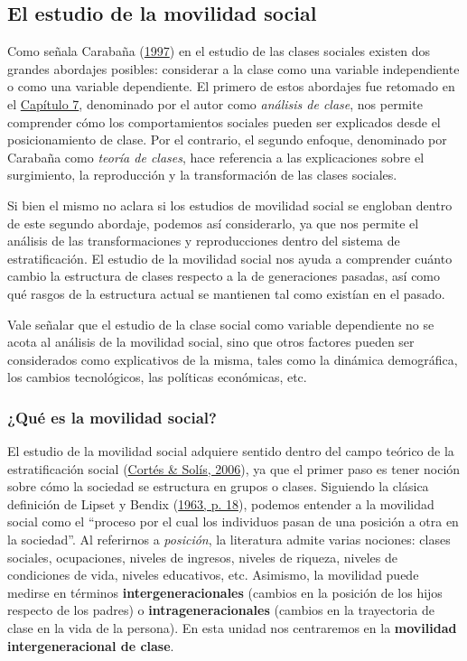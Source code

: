 \documentclass[
]{article}
\begin{document}
\hypertarget{movilidad1}{%
\subsection{El estudio de la movilidad social}\label{movilidad1}}

Como señala Carabaña (\protect\hyperlink{ref-Carabana1997}{1997}) en el estudio de las clases sociales existen dos grandes abordajes posibles: considerar a la clase como una variable independiente o como una variable dependiente. El primero de estos abordajes fue retomado en el \protect\hyperlink{independiente}{Capítulo 7}, denominado por el autor como \emph{análisis de clase}, nos permite comprender cómo los comportamientos sociales pueden ser explicados desde el posicionamiento de clase. Por el contrario, el segundo enfoque, denominado por Carabaña como \emph{teoría de clases}, hace referencia a las explicaciones sobre el surgimiento, la reproducción y la transformación de las clases sociales.

Si bien el mismo no aclara si los estudios de movilidad social se engloban dentro de este segundo abordaje, podemos así considerarlo, ya que nos permite el análisis de las transformaciones y reproducciones dentro del sistema de estratificación. El estudio de la movilidad social nos ayuda a comprender cuánto cambio la estructura de clases respecto a la de generaciones pasadas, así como qué rasgos de la estructura actual se mantienen tal como existían en el pasado.

Vale señalar que el estudio de la clase social como variable dependiente no se acota al análisis de la movilidad social, sino que otros factores pueden ser considerados como explicativos de la misma, tales como la dinámica demográfica, los cambios tecnológicos, las políticas económicas, etc.

\hypertarget{quuxe9-es-la-movilidad-social}{%
\subsubsection{¿Qué es la movilidad social?}\label{quuxe9-es-la-movilidad-social}}

El estudio de la movilidad social adquiere sentido dentro del campo teórico de la estratificación social (\protect\hyperlink{ref-Cortes.Solis2006}{Cortés \& Solís, 2006}), ya que el primer paso es tener noción sobre cómo la sociedad se estructura en grupos o clases. Siguiendo la clásica definición de Lipset y Bendix (\protect\hyperlink{ref-Lipset.Bendix1963}{1963, p. 18}), podemos entender a la movilidad social como el ``proceso por el cual los individuos pasan de una posición a otra en la sociedad''. Al referirnos a \emph{posición}, la literatura admite varias nociones: clases sociales, ocupaciones, niveles de ingresos, niveles de riqueza, niveles de condiciones de vida, niveles educativos, etc. Asimismo, la movilidad puede medirse en términos \textbf{intergeneracionales} (cambios en la posición de los hijos respecto de los padres) o \textbf{intrageneracionales} (cambios en la trayectoria de clase en la vida de la persona). En esta unidad nos centraremos en la \textbf{movilidad intergeneracional de clase}.
\end{document}
